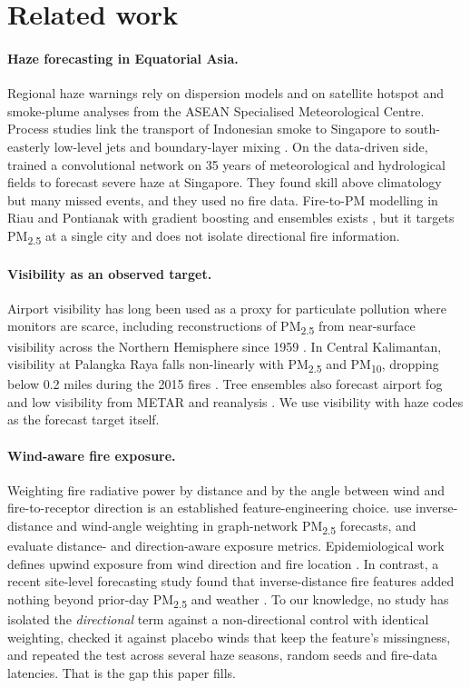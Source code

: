 \section{Related work}
\label{sec:related}

\paragraph{Haze forecasting in Equatorial Asia.}
Regional haze warnings rely on dispersion models and on satellite hotspot and smoke-plume analyses
from the ASEAN Specialised Meteorological Centre. Process studies link the transport of Indonesian
smoke to Singapore to south-easterly low-level jets and boundary-layer mixing
\citep{huang2024haze}. On the data-driven side, \citet{wang2020haze} trained a convolutional network
on 35 years of meteorological and hydrological fields to forecast severe haze at Singapore. They
found skill above climatology but many missed events, and they used no fire data. Fire-to-PM
modelling in Riau and Pontianak with gradient boosting and ensembles exists \citep{pontianak2026},
but it targets PM\textsubscript{2.5} at a single city and does not isolate directional fire
information.

\paragraph{Visibility as an observed target.}
Airport visibility has long been used as a proxy for particulate pollution where monitors are
scarce, including reconstructions of PM\textsubscript{2.5} from near-surface visibility across
the Northern Hemisphere since 1959 \citep{metarpm2024}. In Central Kalimantan, visibility at Palangka Raya falls non-linearly with
PM\textsubscript{2.5} and PM\textsubscript{10}, dropping below 0.2 miles during the 2015 fires
\citep{palangka2022}. Tree ensembles also forecast airport fog and low visibility from METAR and
reanalysis \citep{fogtransfer2025}. We use visibility with haze codes as the forecast target
itself.

\paragraph{Wind-aware fire exposure.}
Weighting fire radiative power by distance and by the angle between wind and fire-to-receptor
direction is an established feature-engineering choice. \citet{gnnfire2023} use inverse-distance
and wind-angle weighting in graph-network PM\textsubscript{2.5} forecasts, and \citet{sci2026exposure}
evaluate distance- and direction-aware exposure metrics. Epidemiological work defines upwind
exposure from wind direction and fire location \citep{aguilera2021}. In contrast, a recent
site-level forecasting study found that inverse-distance fire features added nothing beyond
prior-day PM\textsubscript{2.5} and weather \citep{santacruz2026}. To our knowledge, no study has
isolated the \emph{directional} term against a non-directional control with identical weighting,
checked it against placebo winds that keep the feature's missingness, and repeated the test across
several haze seasons, random seeds and fire-data latencies. That is the gap this paper fills.

